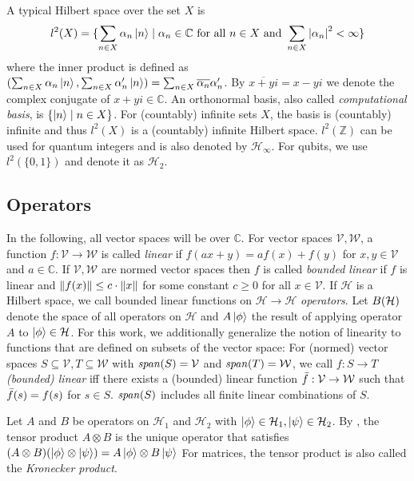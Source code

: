 \documentclass[a4paper,UKenglish,cleveref, autoref, thm-restate]{lipics-v2021}
\begin{document}
\begin{example}
    A typical Hilbert space over the set $X$ is
    \begin{align*}
        l^2(X) = \{\sum_{n\in X} \alpha_n \ket{n}\mid \alpha_n \in \mathbb{C} \text{ for all }n\in X\text{ and } \sum_{n\in X} \abs{\alpha_n}^2 < \infty\}
    \end{align*}
    where the inner product is defined as $
        (\sum_{n\in X} \alpha_n \ket{n}, \sum_{n\in X}\alpha'_n \ket{n}) = \sum_{n\in X} \overline{\alpha_n} \alpha'_n$. By $\overline{x+yi}=x-yi$ we denote the complex conjugate of $x+yi \in \mathbb{C}$.
    An orthonormal basis, also called \emph{computational basis}, is $\{\ket{n}\mid n\in X\}$.
    For (countably) infinite sets $X$, the basis is (countably) infinite and thus $l^2(X)$ is a (countably) infinite Hilbert space.
    $l^2(\mathbb{Z})$ can be used for quantum integers and is also denoted by $\mathcal{H}_\infty$.
    For qubits, we use $l^2(\{0,1\})$ and denote it as $\mathcal{H}_2$.\end{example}

\subsection{Operators}
In the following, all vector spaces will be over $\mathbb{C}$.
For vector spaces $\mathcal{V}, \mathcal{W}$, a function $f:\mathcal{V}\to \mathcal{W}$ is called \emph{linear} if $f(ax+y)=af(x)+f(y)$ for $x,y\in \mathcal{V}$ and $a\in \mathbb{C}$. If $\mathcal{V}, \mathcal{W}$ are normed vector spaces then $f$ is called \emph{bounded linear} if $f$ is linear and $\norm{f(x)} \leq c \cdot \norm{ x}$ for some constant $c \geq 0$ for all $x \in \mathcal{V}$.
If $\mathcal{H}$ is a Hilbert space, we call bounded linear functions on $\mathcal{H} \to \mathcal{H}$ \emph{operators}. Let $B(\mathcal{H})$ denote the space of all operators on $\mathcal{H}$ and $A\ket{\phi}$ the result of applying operator $A$ to $\ket{\phi}\in \mathcal{H}$.
For this work, we additionally generalize the notion of linearity to functions that are defined on subsets of the vector space:
For (normed) vector spaces $S\subseteq \mathcal{V},T\subseteq \mathcal{W}$ with $\mathit{span}(S)=\mathcal{V}$ and $\mathit{span}(T)=\mathcal{W}$, we call $f: S \to T$ \emph{(bounded) linear} iff there exists a (bounded) linear function $\Bar{f}: \mathcal{V} \to \mathcal{W}$ such that $\Bar{f}(s) = f(s)$ for $s \in S$. $\mathit{span}(S)$ includes all finite linear combinations of $S$.

Let $A$ and $B$ be operators on $\mathcal{H}_1$ and $\mathcal{H}_2$ with $\ket{\phi} \in \mathcal{H}_1, \ket{\psi} \in \mathcal{H}_2$. By \cite[Def. IV.1.3]{takesaki1979theory}, the tensor product $A \otimes B$ is the unique operator that satisfies $(A \otimes B)( \ket{\phi }\otimes \ket{\psi}) = A \ket{\phi} \otimes B\ket{\psi}$
For matrices, the tensor product is also called the \emph{Kronecker product}.
\end{document}
